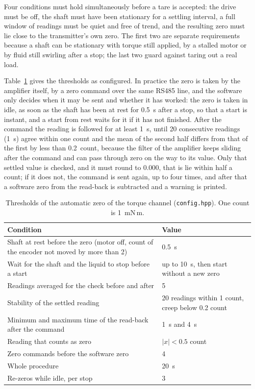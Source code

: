Four conditions must hold simultaneously before a tare is accepted: the drive must be off, the shaft must have been stationary for a settling interval, a full window of readings must be quiet and free of trend, and the resulting zero must lie close to the transmitter's own zero. The first two are separate requirements because a shaft can be stationary with torque still applied, by a stalled motor or by fluid still swirling after a stop; the last two guard against taring out a real load.

Table~\ref{tab:tare} gives the thresholds as configured. In practice the zero is taken by the amplifier itself, by a zero command over the same RS485 line, and the software only decides when it may be sent and whether it has worked: the zero is taken in idle, as soon as the shaft has been at rest for 0.5~s after a stop, so that a start is instant, and a start from rest waits for it if it has not finished. After the command the reading is followed for at least 1~s, until 20 consecutive readings (1~s) agree within one count and the mean of the second half differs from that of the first by less than 0.2~count, because the filter of the amplifier keeps sliding after the command and can pass through zero on the way to its value. Only that settled value is checked, and it must round to 0.000, that is lie within half a count; if it does not, the command is sent again, up to four times, and after that a software zero from the read-back is subtracted and a warning is printed.

\begin{table}[htbp]
    \centering
    \caption[Thresholds of the automatic torque zero]{Thresholds of the automatic zero of the torque channel (\texttt{config.hpp}). One count is 1~mN\,m.}
    \label{tab:tare}
    \small
    \begin{tabular}{@{}p{7.2cm}p{4.6cm}@{}}
        \toprule
        Condition & Value \\
        \midrule
        Shaft at rest before the zero (motor off, count of the encoder not moved by more than 2) & 0.5~s \\
        Wait for the shaft and the liquid to stop before a start & up to 10~s, then start without a new zero \\
        Readings averaged for the check before and after & 5 \\
        Stability of the settled reading & 20 readings within 1 count, creep below 0.2 count \\
        Minimum and maximum time of the read-back after the command & 1~s and 4~s \\
        Reading that counts as zero & $|x| < 0.5$ count \\
        Zero commands before the software zero & 4 \\
        Whole procedure & 20~s \\
        Re-zeros while idle, per stop & 3 \\
        \bottomrule
    \end{tabular}
\end{table}

